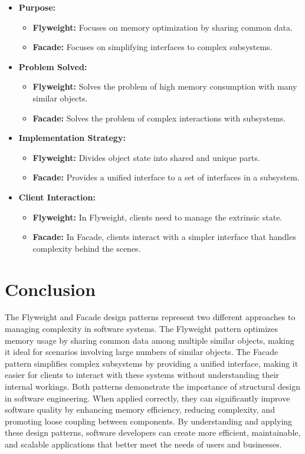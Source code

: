 \documentclass[12pt,a4paper]{article}
\begin{document}
\begin{itemize}
    \item \textbf{Purpose:}
    \begin{itemize}
        \item \textbf{Flyweight:} Focuses on memory optimization by sharing common data.
        \item \textbf{Facade:} Focuses on simplifying interfaces to complex subsystems.
    \end{itemize}
    \item \textbf{Problem Solved:}
    \begin{itemize}
        \item \textbf{Flyweight:} Solves the problem of high memory consumption with many similar objects.
        \item \textbf{Facade:} Solves the problem of complex interactions with subsystems.
    \end{itemize}
    \item \textbf{Implementation Strategy:}
    \begin{itemize}
        \item \textbf{Flyweight:} Divides object state into shared and unique parts.
        \item \textbf{Facade:} Provides a unified interface to a set of interfaces in a subsystem.
    \end{itemize}
    \item \textbf{Client Interaction:}
    \begin{itemize}
        \item \textbf{Flyweight:} In Flyweight, clients need to manage the extrinsic state.
        \item \textbf{Facade:} In Facade, clients interact with a simpler interface that handles complexity behind the scenes.
    \end{itemize}
\end{itemize}

\section{Conclusion}
The Flyweight and Facade design patterns represent two different approaches to managing complexity in software systems. The Flyweight pattern optimizes memory usage by sharing common data among multiple similar objects, making it ideal for scenarios involving large numbers of similar objects. The Facade pattern simplifies complex subsystems by providing a unified interface, making it easier for clients to interact with these systems without understanding their internal workings. Both patterns demonstrate the importance of structural design in software engineering. When applied correctly, they can significantly improve software quality by enhancing memory efficiency, reducing complexity, and promoting loose coupling between components. By understanding and applying these design patterns, software developers can create more efficient, maintainable, and scalable applications that better meet the needs of users and businesses.
\end{document}
